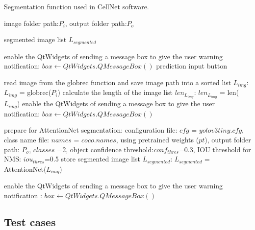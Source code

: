 \begin{algorithm}[t]
  \caption{Segmentation function used in CellNet software.}
  \label{alg:Framwork}
  \begin{algorithmic}[1]
    \Require
    image folder path:$P_{i}$, output folder path:$P_{o}$
    
    \Ensure
     segmented image list $L_{segmented}$
  
      
      \State  enable the QtWidgets of sending a message box to give the user warning notification: $box  \gets QtWidgets.QMessageBox()$
      \State  \set prediction input button \false
      
    \Else
      \State  read image from the globrec function and save image path into a sorted list $L_{img}$: $L_{img}$ = globrec($P_{i}$)
      \State  calculate the length of the image list $len_{L_{img}}$: $len_{L_{img}}$ = len($L_{img}$)
      \State  enable the QtWidgets of sending a message box to give the user notification: $box  \gets QtWidgets.QMessageBox()$
    
      \State  prepare for AttentionNet segmentation: \newline configuration file: $cfg$ = $yolov3tiny.cfg$, class name file: $names$ = $coco.names$, using pretrained weights ($pt$), output folder path: $P_{o}$, $classes$ =2, object confidence threshold:$conf_{thres}$=0.3, IOU threshold for NMS: $iou_{thres}$=0.5
      \State  store segmented image list $L_{segmented}$: $L_{segmented}$ = AttentionNet($L_{img}$)
      
      \State  enable the QtWidgets of sending a message box to give the user warning notification : $box  \gets QtWidgets.QMessageBox()$
      
    \EndIf \newline
  \end{algorithmic}
\end{algorithm}



\subsection{Test cases} %
\label{sub:amet}

